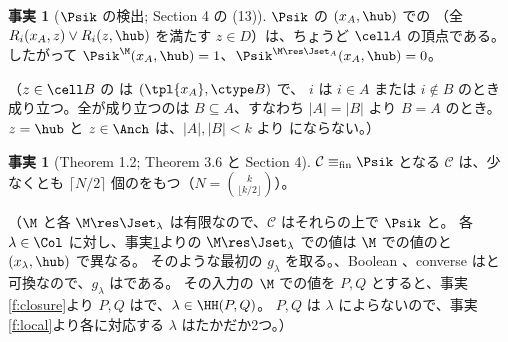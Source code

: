 \documentclass[11pt,a4paper]{ltjsarticle}
\newcommand{\Comp}{\mathcal C}
\theoremstyle{definition}
\newtheorem{fact}[definition]{事実}
\begin{document}
\begin{fact}[$\Psik$ の検出; Section 4 の (13)]\label{f:detect}
$\Psik$ の $(x_A,\hub)$ での （全 $R_i(x_A,z)\lor R_i(z,\hub)$ を満たす $z\in D$）は、ちょうど $\cell A$ の頂点である。
したがって $\Psik^{\M}(x_A,\hub)=1$、$\Psik^{\M\res \Jset_A}(x_A,\hub)=0$。
\end{fact}
（$z\in\cell B$ の  は $(\tpl{x_A},\ctype B)$ で、 $i$ は $i\in A$ または $i\notin B$ のとき成り立つ。全が成り立つのは $B\subseteq A$、すなわち $|A|=|B|$ より $B=A$ のとき。$z=\hub$ と $z\in \Anch$ は、$|A|,|B|<k$ より  にならない。）

\begin{fact}[Theorem 1.2; Theorem 3.6 と Section 4]\label{f:thm}
$\Comp\equiv_{\rm fin}\Psik$ となる $\Comp$ は、少なくとも $\lceil N/2\rceil$ 個のをもつ（$N=\binom{k}{\lfloor k/2\rfloor}$）。
\end{fact}
（$\M$ と各 $\M\res \Jset_\lambda$ は有限なので、$\Comp$ はそれらの上で $\Psik$ と。
各 $\lambda\in\Col$ に対し、事実\ref{f:detect}よりの $\M\res \Jset_\lambda$ での値は $\M$ での値のと $(x_\lambda,\hub)$ で異なる。
そのような最初の $g_\lambda$ を取る。、Boolean 、converse はと可換なので、$g_\lambda$ はである。
その入力の $\M$ での値を $P,Q$ とすると、事実\ref{f:closure}より $P,Q$ はで、$\lambda\in \HH(P,Q)$。
$P,Q$ は $\lambda$ によらないので、事実\ref{f:local}より各に対応する $\lambda$ はたかだか2つ。）
\end{document}
